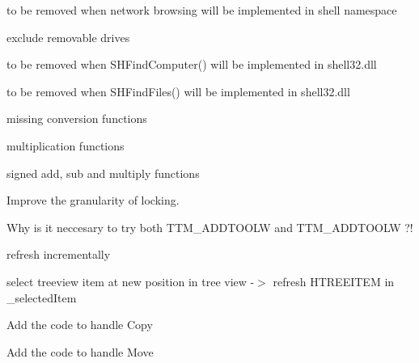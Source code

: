 \begin{DoxyRefList}
to be removed when network browsing will be implemented in shell namespace 

exclude removable drives  
\item[\label{todo__todo000070}%
\Hypertarget{todo__todo000070}%
成员 \hyperlink{struct_start_menu_handler_a7ebc2b808763f6ad884ad8d5b03b6069}{Start\+Menu\+Handler\+:\+:Show\+Search\+Computer} ()]to be removed when S\+H\+Find\+Computer() will be implemented in shell32.\+dll  
\item[\label{todo__todo000069}%
\Hypertarget{todo__todo000069}%
成员 \hyperlink{struct_start_menu_handler_ac06629f59aa85cbaf1b5adfbc62ff124}{Start\+Menu\+Handler\+:\+:Show\+Search\+Dialog} ()]to be removed when S\+H\+Find\+Files() will be implemented in shell32.\+dll  
\item[\label{todo__todo000090}%
\Hypertarget{todo__todo000090}%
命名空间 \hyperlink{namespace_this}{This} ]
\begin{DoxyItemize}
\item missing conversion functions
\item multiplication functions
\item signed add, sub and multiply functions  
\end{DoxyItemize}
\item[\label{todo__todo000005}%
\Hypertarget{todo__todo000005}%
组 \hyperlink{structgl__shared__state_amgrp1aabb42ef5c0be751dec3bdf1c2a775d}{Thread safety and statechange notification for texture} ]Improve the granularity of locking.  
\item[\label{todo__todo000087}%
\Hypertarget{todo__todo000087}%
成员 \hyperlink{struct_tool_tip_a1f3f3b100484b08d5120678cf2d9ead5}{Tool\+Tip\+:\+:add} (H\+W\+ND hparent, H\+W\+ND htool, L\+P\+C\+T\+S\+TR txt=L\+P\+S\+T\+R\+\_\+\+T\+E\+X\+T\+C\+A\+L\+L\+B\+A\+CK, L\+P\+A\+R\+AM lparam=0)]Why is it neccesary to try both T\+T\+M\+\_\+\+A\+D\+D\+T\+O\+O\+LW and T\+T\+M\+\_\+\+A\+D\+D\+T\+O\+O\+LW ?!  
\item[\label{todo__todo000077}%
\Hypertarget{todo__todo000077}%
成员 \hyperlink{struct_tray_notify_dlg_a8e27d7865edb16d7bbecff7534116899}{Tray\+Notify\+Dlg\+:\+:Refresh} ()]refresh incrementally  
\item[\label{todo__todo000078}%
\Hypertarget{todo__todo000078}%
成员 \hyperlink{struct_tray_notify_dlg_a001841ee0119a56a1f009a3694109ea5}{Tray\+Notify\+Dlg\+:\+:Set\+Icon\+Mode} (N\+O\+T\+I\+F\+Y\+I\+C\+O\+N\+M\+O\+DE mode)]select treeview item at new position in tree view -\/$>$ refresh H\+T\+R\+E\+E\+I\+T\+EM in \+\_\+selected\+Item  
\item[\label{todo__todo000082}%
\Hypertarget{todo__todo000082}%
成员 \hyperlink{class_tree_drop_target_a068695082ff9d2081042b792205b538a}{Tree\+Drop\+Target\+:\+:On\+Drop} (F\+O\+R\+M\+A\+T\+E\+TC $\ast$p\+Fmt\+Etc, S\+T\+G\+M\+E\+D\+I\+UM \&medium, D\+W\+O\+RD $\ast$pdw\+Effect)]Add the code to handle Copy 

Add the code to handle Move  
\item[\label{todo__todo000050}%
\Hypertarget{todo__todo000050}%
成员 \hyperlink{struct_web_child_window_a2f4af4c8464073f0e569d878eec1db69}{Web\+Child\+Window\+:\+:Wnd\+Proc} (U\+I\+NT nmsg, W\+P\+A\+R\+AM wparam, L\+P\+A\+R\+AM lparam)]
\end{DoxyRefList}